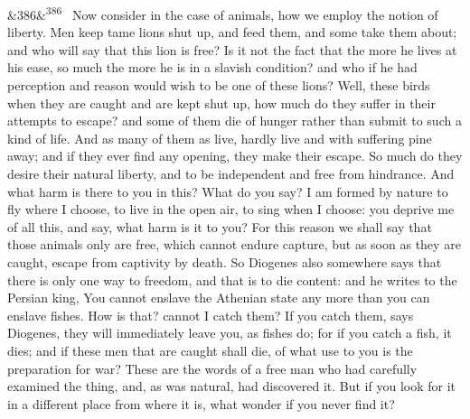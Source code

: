 \documentclass[12pt]{article}
\newcommand{\para}[1][]{\par\noindent\ifx&#1&\else\textsuperscript{\footnotesize #1}~\fi}
\begin{document}
\para[386] Now consider in the case of animals, how we employ the notion of liberty. Men keep tame lions shut up, and feed them, and some take them about; and who will say that this lion is free? Is it not the fact that the more he lives at his ease, so much the more he is in a slavish condition? and who if he had perception and reason would wish to be one of these lions? Well, these birds when they are caught and are kept shut up, how much do they suffer in their attempts to escape? and some of them die of hunger rather than submit to such a kind of life. And as many of them as live, hardly live and with suffering pine away; and if they ever find any opening, they make their escape. So much do they desire their natural liberty, and to be independent and free from hindrance. And what harm is there to you in this? What do you say? I am formed by nature to fly where I choose, to live in the open air, to sing when I choose: you deprive me of all this, and say, what harm is it to you? For this reason we shall say that those animals only are free, which cannot endure capture, but as soon as they are caught, escape from captivity by death. So Diogenes also somewhere says that there is only one way to freedom, and that is to die content: and he writes to the Persian king, You cannot enslave the Athenian state any more than you can enslave fishes. How is that? cannot I catch them? If you catch them, says Diogenes, they will immediately leave you, as fishes do; for if you catch a fish, it dies; and if these men that are caught shall die, of what use to you is the preparation for war? These are the words of a free man who had carefully examined the thing, and, as was natural, had discovered it. But if you look for it in a different place from where it is, what wonder if you never find it?
\end{document}
